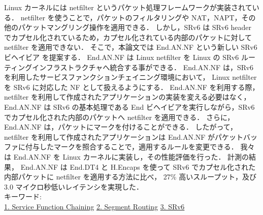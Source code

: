 Linux カーネルには netfilter というパケット処理フレームワークが実装されている．
netfilter を使うことで，パケットのフィルタリングや NAT，NAPT，その他のパケットマングリング操作を適用できる．
しかし，SRv6 は SRv6 header でカプセル化されているため，カプセル化されている内部のパケットに対して netfilter を適用できない．
そこで，本論文では End.AN.NF という新しい SRv6 ビヘイビア を提案する．
End.AN.NF は Linux netfilter を Linux の SRv6 ルーティングインフラストラクチャへ統合する事ができる．
End.AN.NF は，SRv6 を利用したサービスファンクションチェイニング環境において，
Linux netfilter を SRv6 に対応した NF として扱えるようにする．
End.AN.NF を利用する際，netfilter を利用して作成されたアプリケーションの実装を変える必要はなく，
End.AN.NF は SRv6 の基本処理である End ビヘイビアを実行しながら，SRv6 でカプセル化された内部のパケットへ netfilter を適用できる．
さらに，End.AN.NF は，パケットにマークを付けることができる．
したがって，netfilter を利用して作成されたアプリケーションは End.AN.NF がパケットバッファに付与したマークを照合することで，適用するルールを変更できる．
我々は End.AN.NF を Linux カーネルに実装し，その性能評価を行った．
計測の結果， End.AN.NF は End.DT4 と H.Encaps を使って SRv6 でカプセル化された内部パケットに netfilter を適用する方法に比べ，
27\% 高いスループット，及び 3.0 マイクロ秒低いレイテンシを実現した．
~ \\
キーワード:\\
\underline{1. Service Function Chaining}
\underline{2. Segment Routing}
\underline{3. SRv6}
\begin{flushright}
\dept \\
\author
\end{flushright}
